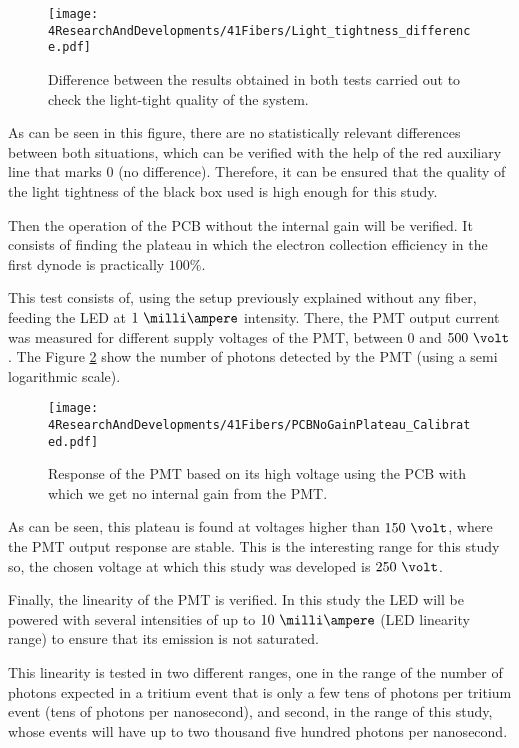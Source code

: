 \begin{figure}[h]
\centering
\texttt{[image: 4ResearchAndDevelopments/41Fibers/Light\_tightness\_difference.pdf]}
\caption{Difference between the results obtained in both tests carried out to check the light-tight quality of the system.\label{fig:LightTightnessTest}}
\end{figure}

As can be seen in this figure, there are no statistically relevant differences between both situations, which can be verified with the help of the red auxiliary line that marks 0 (no difference). Therefore, it can be ensured that the quality of the light tightness of the black box used is high enough for this study.

Then the operation of the PCB without the internal gain will be verified. It consists of finding the plateau in which the electron collection efficiency in the first dynode is practically $100\%$. 

This test consists of, using the setup previously explained without any fiber, feeding the LED at $1~\milli\ampere$ intensity. There, the PMT output current was measured for different supply voltages of the PMT, between $0$ and $500~\volt$. The Figure \ref{fig:PlateauNoGainPMT} show the number of photons detected by the PMT (using a semi logarithmic scale).

\begin{figure}[h]
\centering
\texttt{[image: 4ResearchAndDevelopments/41Fibers/PCBNoGainPlateau\_Calibrated.pdf]}
\caption{Response of the PMT based on its high voltage using the PCB with which we get no internal gain from the PMT.\label{fig:PlateauNoGainPMT}}
\end{figure}

As can be seen, this plateau is found at voltages higher than $150~\volt$, where the PMT output response are stable. This is the interesting range for this study so, the chosen voltage at which this study was developed is $250~\volt$.

Finally, the linearity of the PMT is verified. In this study the LED will be powered with several intensities of up to $10~\milli\ampere$ (LED linearity range) to ensure that its emission is not saturated.

This linearity is tested in two different ranges, one in the range of the number of photons expected in a tritium event that is only a few tens of photons per tritium event (tens of photons per nanosecond), and second, in the range of this study, whose events will have up to two thousand five hundred photons per nanosecond.

